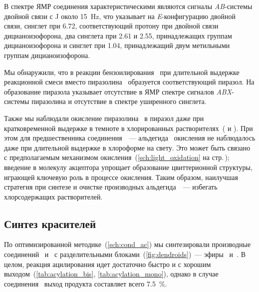В спектре ЯМР  соединения  характеристическими являются сигналы \emph{AB}-системы двойной связи с \ac{J} около \SI{15}{\hertz}, что указывает на \emph{E}-конфигурацию двойной связи, синглет при \SI{6.72}{\ppm}, соответствующий протону при двойной связи дицианоизофорона, два синглета при 2.61 и \SI{2.55}{\ppm}, принадлежащих  группам дицианоизофорона и синглет при \SI{1.04}{\ppm}, принадлежащий двум метильными группам дицианоизофорона.

Мы обнаружили, что в реакции бензоилирования~ при длительной выдержке реакционной смеси вместо пиразолина~ образуется соответствующий пиразол.
На образование пиразола указывает отсутствие в  ЯМР спектре сигналов \emph{ABX}-системы пиразолина и отсутствие в спектре  уширенного синглета.

Также мы наблюдали окисление пиразолина~ в пиразол даже при кратковременной выдержке в темноте в хлорированных растворителях~( и ).
При этом для предшественника соединения~~--- альдегида~ окисления не наблюдалось даже при длительной выдержке в хлороформе на свету.
Это может быть связано с предполагаемым механизмом окисления~(\ref{sch:light_oxidation} на стр.\,\pageref{sch:light_oxidation}); введение в молекулу акцептора упрощает образование цвиттерионной структуры, играющей ключевую роль в процессе окисления.
Таким образом, наилучшая стратегия при синтезе и очистке производных альдегида~~--- избегать хлорсодержащих растворителей.

\subsection{Синтез красителей}

По оптимизированной методике~(\ref{sch:cond_ac}) мы синтезировали производные соединений~ и~ с разделительными блоками~(\ref{fig:dendroids})~--- эфиры~ и~.
В целом, реакция ацилирования идет достаточно быстро и с хорошим выходом~(\ref{tab:acylation_bis}, \ref{tab:acylation_mono}), однако в случае соединения~ выход продукта составляет всего \SI{7.5}{\percent}.

